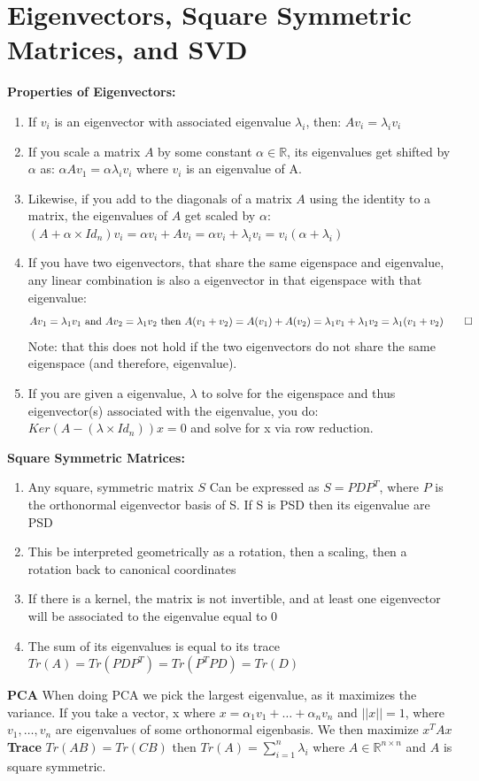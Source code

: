\documentclass[12pt,twoside]{article}
\newcommand{\Id}{Id}
\newcommand{\R}{\mathbb{R}}
\begin{document}
\section*{Eigenvectors, Square Symmetric Matrices, and SVD}
\textbf{Properties of Eigenvectors:}
\begin{enumerate}
    \item If $v_i$ is an eigenvector with associated eigenvalue $\lambda_i$, then: $Av_i = \lambda_i v_i$
    \item If you scale a matrix $A$ by some constant $\alpha \in \R$, its eigenvalues get shifted by $\alpha$ as: $\alpha Av_1 = \alpha \lambda_i v_i$ where $v_i$ is an eigenvalue of A.
    \item Likewise, if you add to the diagonals of a matrix $A$ using the identity to a matrix, the eigenvalues of $A$ get scaled by $\alpha$: $(A+\alpha \times Id_n)v_i = \alpha v_i + Av_i = \alpha v_i + \lambda_i v_i = v_i(\alpha + \lambda_i)$
    \item If you have two eigenvectors, that share the same eigenspace and eigenvalue, any linear combination is also a eigenvector in that eigenspace with that eigenvalue:
    $$
        Av_1 = \lambda_1 v_1 \text{ and } Av_2 = \lambda_1 v_2 \text{ then } A(v_1 + v_2) = A(v_1) + A(v_2) = \lambda_1 v_1 + \lambda_1 v_2 = \lambda_1(v_1+v_2) \qed
    $$ Note: that this does not hold if the two eigenvectors do not share the same eigenspace (and therefore, eigenvalue).
    \item If you are given a eigenvalue, $\lambda$ to solve for the eigenspace and thus eigenvector(s) associated with the eigenvalue, you do: $Ker(A-(\lambda \times \Id_n))x=0$ and solve for x via row reduction.
\end{enumerate}
\textbf{Square Symmetric Matrices:}
\begin{enumerate}
    \item Any square, symmetric matrix $S$ Can be expressed as $S = PDP^T$, where $P$ is the orthonormal eigenvector basis of S. If S is PSD then its eigenvalue are PSD 
    \item This be interpreted geometrically as a rotation, then a scaling, then a rotation back to canonical coordinates
    \item If there is a kernel, the matrix is not invertible, and at least one eigenvector will be associated to the eigenvalue equal to 0
    \item The sum of its eigenvalues is equal to its trace $Tr(A) = Tr(PDP^T) = Tr(P^TPD) = Tr(D)$
\end{enumerate}
\textbf{PCA} When doing PCA we pick the largest eigenvalue, as it maximizes the variance. If you take a vector, x where $x=\alpha_1v_1 + \dots + \alpha_n v_n$ and $||x|| = 1$, where $v_1, \dots, v_n$ are eigenvalues of some orthonormal eigenbasis. We then maximize $x^TAx$ \\ 
\textbf{Trace} $Tr(AB) = Tr(CB)$ then $Tr(A) = \sum_{i=1}^n \lambda_i$ where $A \in \R^{n \times n}$ and $A$ is square symmetric.
\end{document}
